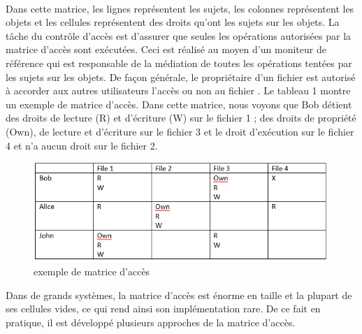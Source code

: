 \paragraph{} Dans cette matrice, les lignes représentent les sujets, les colonnes représentent les objets et les cellules représentent des droits qu'ont les sujets sur les objets. La tâche du contrôle d'accès est d'assurer que seules les opérations autorisées par la matrice d'accès sont exécutées. Ceci est réalisé au moyen d'un moniteur de référence qui est responsable de la médiation de toutes les opérations tentées par les sujets sur les objets. De façon générale, le propriétaire d'un fichier est autorisé à accorder aux autres utilisateurs l'accès ou non au fichier \cite{sandhu94}. Le tableau 1 montre un exemple de matrice d'accès. Dans cette matrice, nous voyons que Bob détient des droits de lecture (R) et d'écriture (W) sur le fichier 1 ; des droits de propriété  (Own), de lecture et d'écriture sur le fichier 3 et le droit d'exécution sur le fichier 4 et n'a aucun droit sur le fichier 2.
\begin{figure}[h!]
    \centering
		\includegraphics[scale=0.7]{chap2/images/ACM.png}
    \caption{exemple de matrice d'accès}
	 \label{figAcm}
\end{figure} 


\label{sectionApproche}

Dans de grands systèmes, la matrice d'accès est énorme en taille et la plupart de ses cellules vides, ce qui rend ainsi son implémentation rare. De ce fait en pratique, il est développé plusieurs approches de la matrice d'accès. 


\label{sectionACL}

